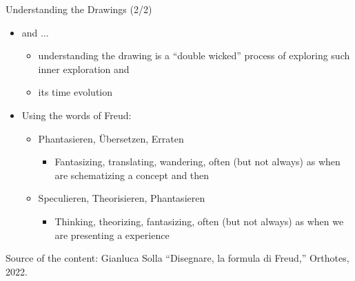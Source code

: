 \documentclass{beamer}
\begin{document}
\begin{frame}
{\centerline{Understanding the Drawings (2/2)}}
 
\begin{itemize}
  \item and $\ldots{}$
\begin{itemize}
     \item understanding the drawing is a ``double wicked'' process of exploring such inner exploration and
     \item its time evolution
\end{itemize}
 \item Using the words of Freud:
 \begin{itemize}
   \item Phantasieren, \"{U}bersetzen, Erraten 
    \begin{itemize}
   \item Fantasizing, translating, wandering, often (but not always) as when are schematizing a concept and then
    \end{itemize} 
   \item Speculieren, Theorisieren, Phantasieren
   \begin{itemize}
   	\item Thinking, theorizing, fantasizing, often (but not always) as when we are presenting a experience
    \end{itemize} 
 \end{itemize} 
 \end{itemize} 

\begin{center}
\tiny
Source of the content: Gianluca Solla ``Disegnare, la formula di Freud,'' Orthotes, 2022.
\end{center}
\end{frame}
\end{document}

